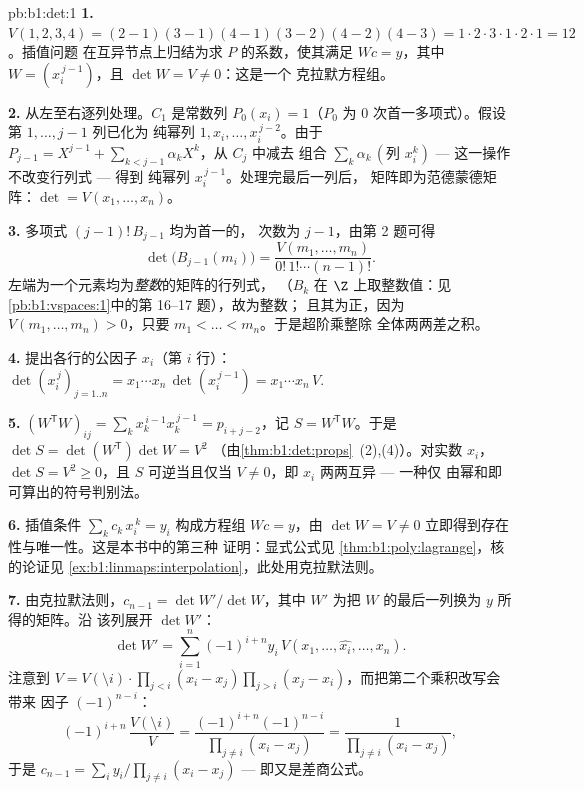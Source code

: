 \begin{solution}{pb:b1:det:1}
\textbf{1.} $V(1,2,3,4) = (2-1)(3-1)(4-1)(3-2)(4-2)(4-3) = 1
\cdot 2\cdot 3\cdot 1\cdot 2\cdot 1 = 12$。插值问题
在互异节点上归结为求 $P$ 的系数，使其满足 $W c =
y$，其中 $W = (x_i^{\,j-1})$，且 $\det W = V \neq 0$：这是一个
克拉默方程组。

\textbf{2.} 从左至右逐列处理。$C_1$
是常数列 $P_0(x_i) = 1$（$P_0$ 为
$0$ 次首一多项式）。假设第 $1, \dots, j-1$ 列已化为
纯幂列 $1, x_i, \dots, x_i^{\,j-2}$。由于 $P_{j-1}
= X^{j-1} + \sum_{k < j-1}\alpha_k X^k$，从 $C_j$ 中减去
组合 $\sum_k \alpha_k\,(\text{列 } x_i^k)$
--- 这一操作不改变行列式 --- 得到
纯幂列 $x_i^{\,j-1}$。处理完最后一列后，
矩阵即为范德蒙德矩阵：$\det = V(x_1, \dots, x_n)$。

\textbf{3.} 多项式 $(j-1)!\,B_{j-1}$ 均为首一的，
次数为 $j - 1$，由第 2 题可得
\[
\det\bigl(B_{j-1}(m_i)\bigr)
= \frac{V(m_1, \dots, m_n)}{0!\,1!\cdots(n-1)!} .
\]
左端为一个元素均为\emph{整数}的矩阵的行列式，
（$B_k$ 在 $\Z$ 上取整数值：见
\cref{pb:b1:vspaces:1}中的第 16--17 题），故为整数；
且其为正，因为 $V(m_1, \dots, m_n) > 0$，只要 $m_1 <
\dots < m_n$。于是超阶乘整除
全体两两差之积。

\textbf{4.} 提出各行的公因子 $x_i$（第 $i$ 行）：
$\det(x_i^{\,j})_{j = 1..n} = x_1\cdots x_n\,
\det(x_i^{\,j-1}) = x_1\cdots x_n\,V$.

\textbf{5.} $(W^{\mathsf T}W)_{ij} = \sum_k x_k^{\,i-1}
x_k^{\,j-1} = p_{i+j-2}$，记 $S = W^{\mathsf T}W$。于是 $\det S =
\det(W^{\mathsf T})\det W = V^2$
（由\cref{thm:b1:det:props}~(2),(4)）。对实数 $x_i$，$\det S = V^2
\geq 0$，且 $S$ 可逆当且仅当 $V \neq 0$，即
$x_i$ 两两互异 --- 一种仅
由幂和即可算出的符号判别法。

\textbf{6.} 插值条件 $\sum_{k}
c_k\,x_i^{\,k} = y_i$ 构成方程组 $Wc = y$，由 $\det W = V \neq
0$ 立即得到存在性与唯一性。这是本书中的第三种
证明：显式公式见
\cref{thm:b1:poly:lagrange}，核的论证见
\cref{ex:b1:linmaps:interpolation}，此处用克拉默法则。

\textbf{7.} 由克拉默法则，$c_{n-1} = \det W'/\det W$，其中 $W'$ 为把 $W$
的最后一列换为 $y$ 所得的矩阵。沿
该列展开 $\det W'$：
\[
\det W' = \sum_{i=1}^n (-1)^{i+n} y_i\,V(x_1, \dots, \widehat{x_i},
\dots, x_n) .
\]
注意到 $V = V(\setminus i)\cdot\prod_{j<i}(x_i - x_j)\prod_{j>i}
(x_j - x_i)$，而把第二个乘积改写会带来
因子 $(-1)^{n-i}$：
\[
(-1)^{i+n}\,\frac{V(\setminus i)}{V}
= \frac{(-1)^{i+n}(-1)^{n-i}}{\prod_{j\neq i}(x_i - x_j)}
= \frac{1}{\prod_{j\neq i}(x_i - x_j)} ,
\]
于是 $c_{n-1} = \sum_i y_i/\prod_{j \neq i}(x_i - x_j)$ ---
即又是差商公式。


\end{solution}
